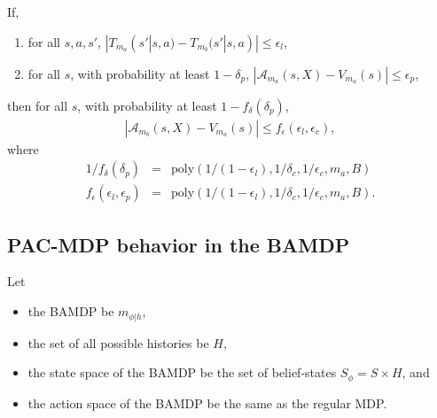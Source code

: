 If,
\begin{enumerate}
\item \label{mcts-bound} for all $s,a,s'$, $|T_{m_a}(s'|s,a) - T_{m_b}(s'|s,a)| \leq \epsilon_l$,
\item \label{mcts-good} for all $s$, with probability at least $1-\delta_p$, $|\mathcal{A}_{m_a}(s,X)-V_{m_a}(s)|\leq \epsilon_p$,
\end{enumerate}
then for all $s$, with probability at least $1-f_\delta(\delta_p)$,
\begin{eqnarray}
|\mathcal{A}_{m_b}(s,X)-V_{m_a}(s)|\leq f_\epsilon(\epsilon_l, \epsilon_c),
\end{eqnarray}
where
\begin{eqnarray}
1/f_\delta(\delta_p)&=&\mbox{poly}(1/(1-\epsilon_l),1/\delta_c,1/\epsilon_c,m_a,B)\\
f_\epsilon(\epsilon_l, \epsilon_p)&=&\mbox{poly}(1/(1-\epsilon_l),1/\delta_c,1/\epsilon_c,m_a,B).
\end{eqnarray}




\subsection{PAC-MDP behavior in the BAMDP}

Let
\begin{itemize}
\item the BAMDP be $m_{\phi|h}$,
\item the set of all possible histories be $H$,
\item the state space of the BAMDP be the set of belief-states $S_\phi = S \times H$, and
\item the action space of the BAMDP be the same as the regular MDP.
\end{itemize}

